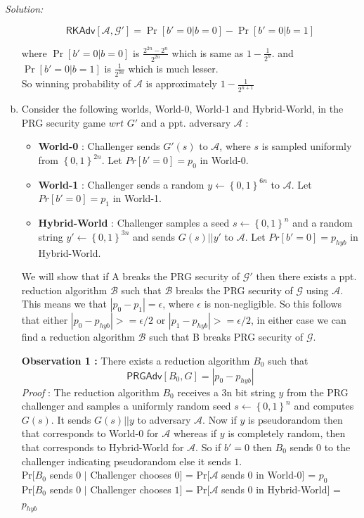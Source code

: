 \documentclass[a4paper, 11pt]{article}
\newenvironment{solution}
    {\textit{Solution:}}
    {\clearpage}
\newcommand{\bit}{\left\{0, 1\right\}}
\newcommand{\prg}{\mathsf{PRGAdv}}
\newcommand{\calA}{\mathcal{A}}
\newcommand{\calB}{\mathcal{B}}
\newcommand{\calG}{\mathcal{G}}
\begin{document}
\begin{solution}
\begin{enumerate}[(a)]
            $$\mathsf{RKAdv}[\calA, \calG'] = \Pr[b'=0|b=0] - \Pr[b'=0|b=1]$$
        
            where $\Pr[b'=0|b=0]$ is $ \frac{2^{2n} - 2^n}{2^{2n}} $ which is same as $1-\frac{1}{2^n}$.
        and $\Pr[b'=0|b=1]$ is $\frac{1}{2^{3n}}$ which is much lesser. \\
        So winning probability of $\calA$ is approximately $1- \frac{1}{2^{n+1}}$

        \item Consider the following worlds, World-0, World-1 and Hybrid-World, in the PRG security game $wrt$ $G'$ and a ppt. adversary $\calA$ : 
        \begin{itemize}
            \item \textbf{World-0} : Challenger sends $G'(s)$ to $\calA$, where $s$ is sampled uniformly from $\bit^{2n}$. Let $Pr[b'=0] = p_0$ in World-0. 
            \item  \textbf{World-1} : Challenger sends a random $y 
        \gets \bit^{6n}$ to $\calA$. Let $Pr[b'=0] = p_1$ in World-1.
            \item \textbf{Hybrid-World} : Challenger samples a seed $s \gets \bit^n$ and a random string $y' \gets \bit^{3n}$ and sends $G(s)||y'$ to $\calA$. Let $Pr[b'=0] = p_{hyb}$ in Hybrid-World.
        \end{itemize}
        We will show that if A breaks the PRG security of $\calG'$ then there exists a ppt. reduction algorithm $\calB$ such that $\calB$ breaks the PRG security of $\calG$ using $\calA$. This means we that $|p_0 - p_1| = \epsilon$, where $\epsilon$ is non-negligible. So this follows that either $|p_0 - p_{hyb}| >= \epsilon/2 $ or $|p_1 - p_{hyb}| >= \epsilon/2 $, in either case we can find a reduction algorithm $\calB$ such that B breaks PRG security of $\calG$.

        \textbf{Observation 1 : } There exists a reduction algorithm $B_0$ such that
         $$\prg[B_0, G] = |p_0 - p_{hyb}|$$
        \textit{Proof} : The reduction algorithm $B_0$ receives a 3n bit string $y$ from the PRG challenger and samples a uniformly random seed $s \gets \bit^n$ and computes $G(s)$. It sends $G(s)||y$ to adversary $\calA$. Now if $y$ is pseudorandom then that corresponds to World-0 for $\calA$ whereas if $y$ is completely random, then that corresponds to Hybrid-World for $\calA$. So if $b' =0$ then $B_0$ sends $0$ to the challenger indicating pseudorandom else it sends $1$. \\
        Pr[$B_0$ sends $0$ $\mid$ Challenger chooses $0$] = Pr[$\calA$ sends 0 in World-0] = $p_0$ \\
        Pr[$B_0$ sends $0$ $\mid$ Challenger chooses $1$] = Pr[$\calA$ sends 0 in Hybrid-World] = $p_{hyb}$ \\


\end{enumerate}
\end{solution}
\end{document}
